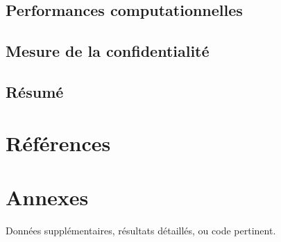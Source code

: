 \documentclass{article}
\begin{document}
    \subsection{Performances computationnelles}
    \subsection{Mesure de la confidentialité}
    \subsection{Résumé}

    \section*{Références}

    \appendix
    \section*{Annexes}
    Données supplémentaires, résultats détaillés, ou code pertinent.
\end{document}
